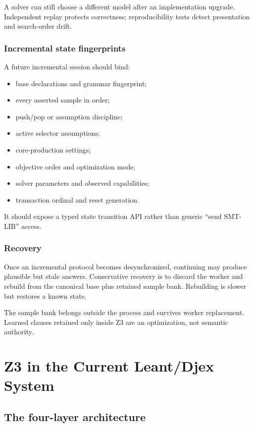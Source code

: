 \documentclass[10pt,letterpaper,oneside]{report}
\begin{document}
A solver can still choose a different model after an implementation upgrade. Independent replay protects correctness; reproducibility tests detect presentation and search-order drift.

\section{Incremental state fingerprints}

A future incremental session should bind:

\begin{itemize}
\item base declarations and grammar fingerprint;
\item every asserted sample in order;
\item push/pop or assumption discipline;
\item active selector assumptions;
\item core-production settings;
\item objective order and optimization mode;
\item solver parameters and observed capabilities;
\item transaction ordinal and reset generation.
\end{itemize}

It should expose a typed state transition API rather than generic ``send SMT-LIB'' access.

\section{Recovery}

Once an incremental protocol becomes desynchronized, continuing may produce plausible but stale answers. Conservative recovery is to discard the worker and rebuild from the canonical base plus retained sample bank. Rebuilding is slower but restores a known state.

The sample bank belongs outside the process and survives worker replacement. Learned clauses retained only inside Z3 are an optimization, not semantic authority.


\part{Z3 in the Current Leant/Djex System}

\chapter{The four-layer architecture}
\label{chap:current-architecture}
\end{document}
